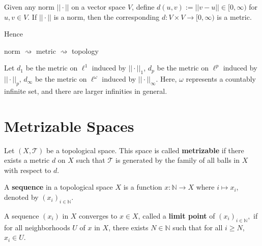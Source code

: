 \documentclass[article,11pt, reqno]{article}
\newtheorem*{lemma}{Lemma}
\theoremstyle{remark}
\newcommand{\mb}{\mathbb}
\newcommand{\mc}{\mathcal}
\newcommand{\<}{\langle}
\renewcommand{\>}{\rangle}
\begin{document}
Given any norm $||\cdot||$ on a vector space $V$, define $d(u,v):=||v-u||\in[0,\infty)$ for $u,v\in V$. If $||\cdot||$ is a norm, then the corresponding $d:V\times V\rightarrow[0,\infty)$ is a metric.

Hence
\begin{center}
    norm $\rightsquigarrow$ metric $\rightsquigarrow$ topology
\end{center}

Let $d_1$ be the metric on $\ell^1$ induced by $||\cdot||_1$, $d_p$ be the metric on $\ell^p$ induced by $||\cdot||_p$, $d_\infty$ be the metric on $\ell^\omega$ induced by $||\cdot||_\infty$. Here, $\omega$ represents a countably infinite set, and there are larger infinities in general.

 
\section{Metrizable Spaces}
Let $(X, \mc T)$ be a topological space. This space is called \textbf{metrizable} if there exists a metric $d$ on $X$ such that $\mc T$ is generated by the family of all balls in $X$ with respect to $d$.

A \textbf{sequence} in a topological space $X$ is a function $x: \mb N\rightarrow X$ where $i\mapsto x_i$, denoted by $(x_i)_{i\in \mb N}$.

A sequence $(x_i)$ in $X$ converges to $x\in X$, called a \textbf{limit point} of $(x_i)_{i\in \mb N},$ if for all neighborhoods $U$ of $x$ in $X$, there exists $N\in\mb N$ such that for all $i\geq N$, $x_i\in U$.\\
\end{document}
